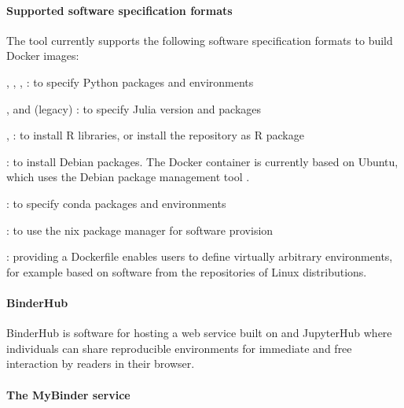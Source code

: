 \paragraph{Supported software specification formats}
\label{repo2docker-supported-software-specifications}
The \repotodocker{} tool currently supports the following software specification
formats to build Docker images:
\begin{compactitem}
\item {}, ,
  , : to specify Python
  packages and environments
\item {},  and (legacy)
  : to
  specify Julia version and packages
\item {}, : to install R
  libraries, or install the repository as R package
\item {}: to install Debian packages. The Docker container
  is currently based on Ubuntu, which uses the Debian package management tool .
\item {}: to specify conda packages and
  environments
\item {}: to use the nix package manager for software provision
\item {}: providing a Dockerfile enables users to define
  virtually arbitrary environments, for example based on software from the
  repositories of Linux distributions.
\end{compactitem}

\paragraph{BinderHub}\label{sec:binderhub}
BinderHub is software for hosting a web service built on \repotodocker{} and
JupyterHub where individuals can share reproducible environments for
immediate and free interaction by readers in their browser.


\paragraph{The MyBinder service}\label{sec:mybinder}


